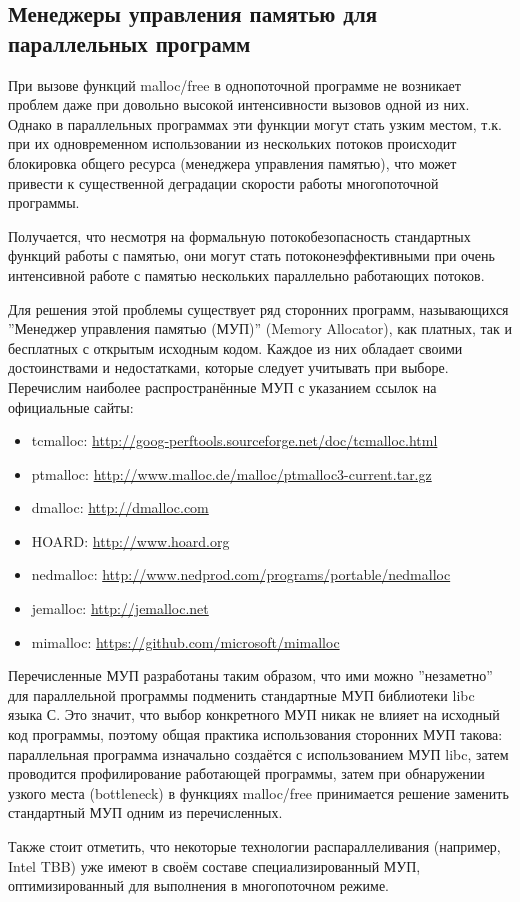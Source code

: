 \subsection{Менеджеры управления памятью для параллельных программ}

При вызове функций malloc/free в однопоточной программе не возникает проблем даже при довольно высокой интенсивности вызовов одной из них. Однако в параллельных программах эти функции могут стать узким местом, т.к. при их одновременном использовании из нескольких потоков происходит блокировка общего ресурса (менеджера управления памятью), что может привести к существенной деградации скорости работы многопоточной программы.

Получается, что несмотря на формальную потокобезопасность стандартных функций работы с памятью, они могут стать потоконеэффективными при очень интенсивной работе с памятью нескольких параллельно работающих потоков.

Для решения этой проблемы существует ряд сторонних программ, называющихся ''Менеджер управления памятью (МУП)'' (Memory Al\-loc\-ator), как платных, так и бесплатных с открытым исходным кодом. Каждое из них обладает своими достоинствами и недостатками, которые следует учитывать при выборе. Перечислим наиболее распространённые МУП с указанием ссылок на официальные сайты:

\begin{itemize}
    \item tcmalloc: \url{http://goog-perftools.sourceforge.net/doc/tcmalloc.html}
    \item ptmalloc: \url{http://www.malloc.de/malloc/ptmalloc3-current.tar.gz}
    \item dmalloc: \url{http://dmalloc.com}
    \item HOARD: \url{http://www.hoard.org}
    \item nedmalloc: \url{http://www.nedprod.com/programs/portable/nedmalloc}
    \item jemalloc: \url{http://jemalloc.net}
    \item mimalloc: \url{https://github.com/microsoft/mimalloc}
\end{itemize}

Перечисленные МУП разработаны таким образом, что ими можно ''незаметно'' для параллельной программы подменить стандартные МУП библиотеки libc языка С. Это значит, что выбор конкретного МУП никак не влияет на исходный код программы, поэтому общая практика использования сторонних МУП такова: параллельная программа изначально создаётся с использованием МУП libc, затем проводится профилирование работающей программы, затем при обнаружении узкого места (bottleneck) в функциях malloc/free принимается решение заменить стандартный МУП одним из перечисленных.

Также стоит отметить, что некоторые технологии распараллеливания (например, Intel TBB) уже имеют в своём составе специализированный МУП, оптимизированный для выполнения в многопоточном режиме.
